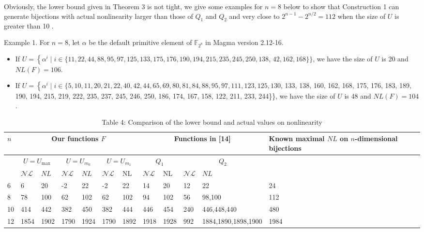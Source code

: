 \documentclass[10pt]{article}
\begin{document}
Obviously, the lower bound given in Theorem 3 is not tight, we give some examples for $n=8$ below to show that Construction 1 can generate bijections with actual nonlinearity larger than those of $Q_{1}$ and $Q_{2}$ and very close to $2^{n-1}-2^{n / 2}=112$ when the size of $U$ is greater than 10 .

Example 1. For $n=8$, let $\alpha$ be the default primitive element of $\mathbb{F}_{2^{8}}$ in Magma version 2.12-16.

\begin{itemize}
  \item If $U=\left\{\alpha^{i} \mid i \in\{11,22,44,88,95,97,125,133,175,176,190,194,215,235,245,250,138\right.$, $42,162,168\}\}$, we have the size of $U$ is 20 and $N L(F)=106$.
  \item If $U=\left\{\alpha^{i} \mid i \in\{5,10,11,20,21,22,40,42,44,65,69,80,81,84,88,95,97,111,123,125,130\right.$, 133, 138, 160, 162, 168, 175, 176, 183, 189, 190, 194, 215, 219, 222, 235, 237, 245, 246, 250, 186, 174, 167, 158, 122, 211, 233, 244\}\}, we have the size of $U$ is 48 and $N L(F)=104$.
\end{itemize}

\begin{table}[h]
\begin{center}
\captionsetup{labelformat=empty}
\caption{Table 4: Comparison of the lower bound and actual values on nonlinearity}
\begin{tabular}{|l|l|l|l|l|l|l|l|l|l|l|l|}
\hline
\multirow{3}{*}{$n$} & \multicolumn{6}{|c|}{Our functions $F$} & \multicolumn{4}{|c|}{Functions in [14]} & \multirow[b]{3}{*}{Known maximal $N L$ on $n$-dimensional bijections} \\
\hline
 & \multicolumn{2}{|c|}{$U=U_{\text {max }}$} & \multicolumn{2}{|c|}{$U=U_{m_{0}}$} & \multicolumn{2}{|c|}{$U=U_{m_{1}}$} & \multicolumn{2}{|c|}{$Q_{1}$} & \multicolumn{2}{|c|}{$Q_{2}$} &  \\
\hline
 & $\mathcal{N} \mathcal{L}$ & $N L$ & $\mathcal{N} \mathcal{L}$ & $N L$ & $\mathcal{N} \mathcal{L}$ & NL & $\mathcal{N} \mathcal{L}$ & NL & $\mathcal{N} \mathcal{L}$ & $N L$ &  \\
\hline
6 & 6 & 20 & -2 & 22 & -2 & 22 & 14 & 20 & 12 & 22 & 24 \\
\hline
8 & 78 & 100 & 62 & 102 & 62 & 102 & 94 & 102 & 56 & 98,100 & 112 \\
\hline
10 & 414 & 442 & 382 & 450 & 382 & 444 & 446 & 454 & 240 & 446,448,440 & 480 \\
\hline
12 & 1854 & 1902 & 1790 & 1924 & 1790 & 1892 & 1918 & 1928 & 992 & 1884,1890,1898,1900 & 1984 \\
\hline
\end{tabular}
\end{center}
\end{table}
\end{document}
